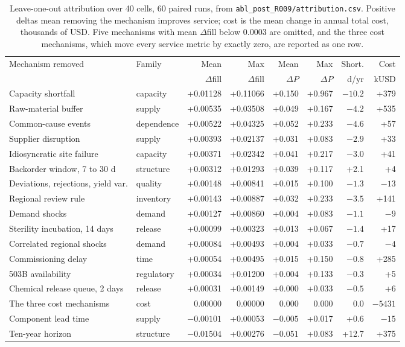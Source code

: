 \begin{table}[htbp]
\centering
\caption{Leave-one-out attribution over 40 cells, 60 paired runs, from
\texttt{abl\_post\_R009/attribution.csv}. Positive deltas mean removing the mechanism improves
service; cost is the mean change in annual total cost, thousands of USD. Five mechanisms with
mean $\Delta$fill below 0.0003 are omitted, and the three cost mechanisms, which move every
service metric by exactly zero, are reported as one row.}
\label{tab:ablation}
\scriptsize
\setlength{\tabcolsep}{4pt}
\begin{tabular}{@{}llrrrrrr@{}}
\toprule
Mechanism removed & Family & Mean & Max & Mean & Max & Short. & Cost \\
                  &        & $\Delta$fill & $\Delta$fill & $\Delta P$ & $\Delta P$ & d/yr & kUSD \\
\midrule
Capacity shortfall & capacity & +0.01128 & +0.11066 & +0.150 & +0.967 & $-10.2$ & +379 \\
Raw-material buffer & supply & +0.00535 & +0.03508 & +0.049 & +0.167 & $-4.2$ & +535 \\
Common-cause events & dependence & +0.00522 & +0.04325 & +0.052 & +0.233 & $-4.6$ & +57 \\
Supplier disruption & supply & +0.00393 & +0.02137 & +0.031 & +0.083 & $-2.9$ & +33 \\
Idiosyncratic site failure & capacity & +0.00371 & +0.02342 & +0.041 & +0.217 & $-3.0$ & +41 \\
Backorder window, 7 to 30 d & structure & +0.00312 & +0.01293 & +0.039 & +0.117 & +2.1 & +4 \\
Deviations, rejections, yield var. & quality & +0.00148 & +0.00841 & +0.015 & +0.100 & $-1.3$ & $-13$ \\
Regional review rule & inventory & +0.00143 & +0.00887 & +0.032 & +0.233 & $-3.5$ & +141 \\
Demand shocks & demand & +0.00127 & +0.00860 & +0.004 & +0.083 & $-1.1$ & $-9$ \\
Sterility incubation, 14 days & release & +0.00099 & +0.00323 & +0.013 & +0.067 & $-1.4$ & +17 \\
Correlated regional shocks & demand & +0.00084 & +0.00493 & +0.004 & +0.033 & $-0.7$ & $-4$ \\
Commissioning delay & time & +0.00054 & +0.00495 & +0.015 & +0.150 & $-0.8$ & +285 \\
503B availability & regulatory & +0.00034 & +0.01200 & +0.004 & +0.133 & $-0.3$ & +5 \\
Chemical release queue, 2 days & release & +0.00031 & +0.00149 & +0.000 & +0.033 & $-0.5$ & +6 \\
The three cost mechanisms & cost & 0.00000 & 0.00000 & 0.000 & 0.000 & 0.0 & $-5431$ \\
Component lead time & supply & $-0.00101$ & +0.00053 & $-0.005$ & +0.017 & +0.6 & $-15$ \\
Ten-year horizon & structure & $-0.01504$ & +0.00276 & $-0.051$ & +0.083 & +12.7 & +375 \\
\bottomrule
\end{tabular}
\end{table}


